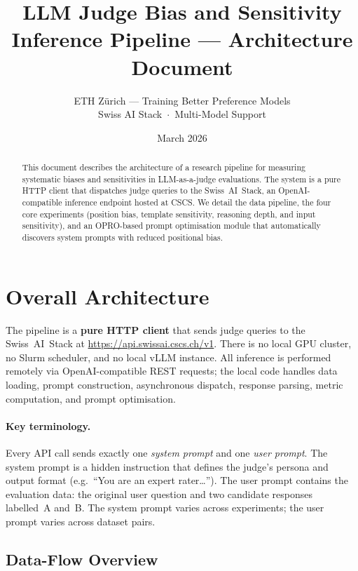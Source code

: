 \documentclass[11pt,a4paper]{article}
\title{%
  \vspace{-1cm}
  \textbf{LLM Judge Bias and Sensitivity}\\[6pt]
  \large Inference Pipeline --- Architecture Document
}
\author{
  ETH Z\"urich --- Training Better Preference Models\\[2pt]
  \small Swiss AI Stack \,$\cdot$\, Multi-Model Support
}
\date{March 2026}
\begin{document}
\maketitle
\thispagestyle{fancy}

\begin{abstract}
This document describes the architecture of a research pipeline for measuring
systematic biases and sensitivities in LLM-as-a-judge evaluations. The system
is a pure HTTP client that dispatches judge queries to the Swiss~AI~Stack,
an OpenAI-compatible inference endpoint hosted at CSCS. We detail the data
pipeline, the four core experiments (position bias, template sensitivity,
reasoning depth, and input sensitivity), and an OPRO-based prompt optimisation
module that automatically discovers system prompts with reduced positional bias.
\end{abstract}

\tableofcontents
\newpage


\section{Overall Architecture}\label{sec:architecture}

The pipeline is a \textbf{pure HTTP client} that sends judge queries to the
Swiss~AI~Stack at \url{https://api.swissai.cscs.ch/v1}. There is no local
GPU cluster, no Slurm scheduler, and no local vLLM instance. All inference
is performed remotely via OpenAI-compatible REST requests; the local code
handles data loading, prompt construction, asynchronous dispatch, response
parsing, metric computation, and prompt optimisation.

\paragraph{Key terminology.}
Every API call sends exactly one \emph{system prompt} and one
\emph{user prompt}. The system prompt is a hidden instruction that defines the
judge's persona and output format (e.g.\ ``You are an expert rater\ldots'').
The user prompt contains the evaluation data: the original user question and
two candidate responses labelled~A and~B. The system prompt varies across
experiments; the user prompt varies across dataset pairs.


\subsection{Data-Flow Overview}
\end{document}
